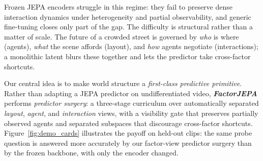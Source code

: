 Frozen JEPA encoders struggle in this regime: they fail to preserve
dense interaction dynamics under heterogeneity and partial
observability, and generic fine-tuning closes only part of the gap. The
difficulty is structural rather than a matter of scale. The future of a
crowded street is governed by \emph{who} is where (agents), \emph{what}
the scene affords (layout), and \emph{how} agents negotiate
(interactions); a monolithic latent blurs these together and lets the
predictor take cross-factor shortcuts.

Our central idea is to make world structure a \emph{first-class
predictive primitive}. Rather than adapting a JEPA predictor on
undifferentiated video, \textbf{\emph{FactorJEPA}} performs
\emph{predictor surgery}: a three-stage curriculum over automatically
separated \emph{layout}, \emph{agent}, and \emph{interaction} views,
with a visibility gate that preserves partially observed agents and
separated subspaces that discourage cross-factor shortcuts.
Figure~\ref{fig:demo_cards} illustrates the payoff on held-out clips:
the same probe question is answered more accurately by our factor-view
predictor surgery than by the frozen backbone, with only the encoder
changed.

